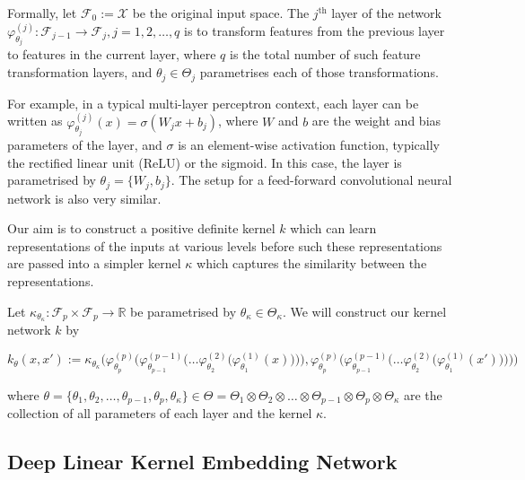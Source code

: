 \documentclass{article}
\begin{document}
		Formally, let $\mathcal{F}_{0} := \mathcal{X}$ be the original input space. The $j^{\mathrm{th}}$ layer of the network $\varphi^{(j)}_{\theta_{j}} : \mathcal{F}_{j - 1} \to \mathcal{F}_{j}, j = 1, 2, \dots, q$ is to transform features from the previous layer to features in the current layer, where $q$ is the total number of such feature transformation layers, and $\theta_{j} \in \Theta_{j}$ parametrises each of those transformations.
		
		For example, in a typical multi-layer perceptron context, each layer can be written as $\varphi^{(j)}_{\theta_{j}}(x) = \sigma(W_{j} x + b_{j})$, where $W$ and $b$ are the weight and bias parameters of the layer, and $\sigma$ is an element-wise activation function, typically the rectified linear unit (ReLU) or the sigmoid. In this case, the layer is parametrised by $\theta_{j} = \{W_{j}, b_{j}\}$. The setup for a feed-forward convolutional neural network is also very similar.
		
		Our aim is to construct a positive definite kernel $k$ which can learn representations of the inputs at various levels before such these representations are passed into a simpler kernel $\kappa$ which captures the similarity between the representations.
		
		Let $\kappa_{\theta_{\kappa}} : \mathcal{F}_{p} \times \mathcal{F}_{p} \to \mathbb{R}$ be parametrised by $\theta_{\kappa} \in \Theta_{\kappa}$. We will construct our kernel network $k$ by
		
		\begin{equation}
		k_{\theta}(x, x') := \kappa_{\theta_{\kappa}}\Bigg(
		\varphi^{(p)}_{\theta_{p}}\bigg(\varphi^{(p - 1)}_{\theta_{p - 1}}\Big(\dots\varphi^{(2)}_{\theta_{2}}\big(\varphi^{(1)}_{\theta_{1}}(x)\big)\Big)\bigg),
		\varphi^{(p)}_{\theta_{p}}\bigg(\varphi^{(p - 1)}_{\theta_{p - 1}}\Big(\dots\varphi^{(2)}_{\theta_{2}}\big(\varphi^{(1)}_{\theta_{1}}(x')\big)\Big)\bigg)
		\Bigg)
		\label{eq:deep_kernel_embedding_network}
		\end{equation}
		
		where $\theta = \{\theta_{1}, \theta_{2}, \dots, \theta_{p -1}, \theta_{p}, \theta_{\kappa}\} \in \Theta = \Theta_{1} \otimes \Theta_{2} \otimes \dots \otimes \Theta_{p - 1} \otimes \Theta_{p} \otimes \Theta_{\kappa}$ are the collection of all parameters of each layer and the kernel $\kappa$.

	\subsection{Deep Linear Kernel Embedding Network}
	\label{app:deep_linear_kernel_embedding_network}
	
\end{document}
